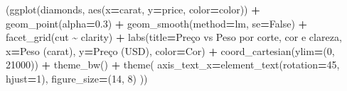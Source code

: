 \documentclass[
]{article}
\newenvironment{Shaded}{\begin{snugshade}}{\end{snugshade}}
\newcommand{\DecValTok}[1]{\textcolor[rgb]{0.00,0.00,0.81}{#1}}
\newcommand{\FloatTok}[1]{\textcolor[rgb]{0.00,0.00,0.81}{#1}}
\newcommand{\NormalTok}[1]{#1}
\newcommand{\OperatorTok}[1]{\textcolor[rgb]{0.81,0.36,0.00}{\textbf{#1}}}
\newcommand{\StringTok}[1]{\textcolor[rgb]{0.31,0.60,0.02}{#1}}
\newcommand{\VariableTok}[1]{\textcolor[rgb]{0.00,0.00,0.00}{#1}}
\begin{document}
\begin{Shaded}
\begin{Highlighting}[]
\NormalTok{(ggplot(diamonds, aes(x}\OperatorTok{=}\StringTok{\textquotesingle{}carat\textquotesingle{}}\NormalTok{, y}\OperatorTok{=}\StringTok{\textquotesingle{}price\textquotesingle{}}\NormalTok{, color}\OperatorTok{=}\StringTok{\textquotesingle{}color\textquotesingle{}}\NormalTok{)) }\OperatorTok{+}
\NormalTok{ geom\_point(alpha}\OperatorTok{=}\FloatTok{0.3}\NormalTok{) }\OperatorTok{+}
\NormalTok{ geom\_smooth(method}\OperatorTok{=}\StringTok{\textquotesingle{}lm\textquotesingle{}}\NormalTok{, se}\OperatorTok{=}\VariableTok{False}\NormalTok{) }\OperatorTok{+}
\NormalTok{ facet\_grid(}\StringTok{\textquotesingle{}cut \textasciitilde{} clarity\textquotesingle{}}\NormalTok{) }\OperatorTok{+}
\NormalTok{ labs(title}\OperatorTok{=}\StringTok{\textquotesingle{}Preço vs Peso por corte, cor e clareza\textquotesingle{}}\NormalTok{,}
\NormalTok{      x}\OperatorTok{=}\StringTok{\textquotesingle{}Peso (carat)\textquotesingle{}}\NormalTok{,}
\NormalTok{      y}\OperatorTok{=}\StringTok{\textquotesingle{}Preço (USD)\textquotesingle{}}\NormalTok{,}
\NormalTok{      color}\OperatorTok{=}\StringTok{\textquotesingle{}Cor\textquotesingle{}}\NormalTok{) }\OperatorTok{+}
\NormalTok{ coord\_cartesian(ylim}\OperatorTok{=}\NormalTok{(}\DecValTok{0}\NormalTok{, }\DecValTok{21000}\NormalTok{)) }\OperatorTok{+}
\NormalTok{ theme\_bw() }\OperatorTok{+}
\NormalTok{ theme(}
\NormalTok{     axis\_text\_x}\OperatorTok{=}\NormalTok{element\_text(rotation}\OperatorTok{=}\DecValTok{45}\NormalTok{, hjust}\OperatorTok{=}\DecValTok{1}\NormalTok{),}
\NormalTok{     figure\_size}\OperatorTok{=}\NormalTok{(}\DecValTok{14}\NormalTok{, }\DecValTok{8}\NormalTok{)}
\NormalTok{ ))}
\end{Highlighting}
\end{Shaded}
\end{document}
